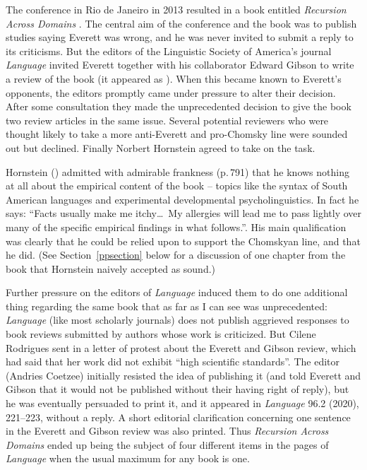 \documentclass[output=paper,colorlinks,citecolor=brown
]{langscibook}
\begin{document}
The conference in Rio de Janeiro in 2013 resulted in a book entitled
\textit{Recursion Across Domains} \citep{AmMaNeRo18}. The central aim
of the conference and the book was to publish studies saying Everett
was wrong, and he was never invited to submit a reply to its
criticisms. But the editors of the Linguistic Society of America's
journal \textit{Language} invited Everett together with his
collaborator Edward Gibson to write a review of the book (it appeared
as \citealt{EverGibs19}). When this became known to Everett's
opponents, the editors promptly came under pressure to alter their
decision. After some consultation they made the unprecedented decision
to give the book two review articles in the same issue. Several
potential reviewers who were thought likely to take a more anti-Everett
and pro-Chomsky line were sounded out but declined. Finally Norbert
Hornstein agreed to take on the task.

Hornstein (\citeyear{Hornstein19}) admitted with admirable frankness
(p.\,791) that he knows nothing at all about the empirical content
of the book -- topics like the syntax of South American languages
and experimental developmental psycholinguistics. In fact he says:
``Facts usually make me itchy\ldots\ My allergies will lead me to pass
lightly over many of the specific empirical findings in what follows.''.
His main qualification was clearly that he could be relied upon to
support the Chomskyan line, and that he did. (See Section~\ref{ppsection}
below for a discussion of one chapter from the book that Hornstein
naively accepted as sound.)

Further pressure on the editors of \textit{Language} induced them to do
one additional thing regarding the same book that as far as I can see was
unprecedented: \textit{Language} (like most scholarly journals) does not
publish aggrieved responses to book reviews submitted by authors whose
work is criticized.
But Cilene Rodrigues sent in a letter of protest about the Everett and
Gibson review, which had said that her work did not exhibit ``high
scientific standards''. The editor (Andries Coetzee) initially resisted
the idea of publishing it (and told Everett and Gibson that it would
not be published without their having right of reply), but he was eventually
persuaded to print it, and it appeared in \textit{Language} 96.2
(2020), 221--223, without a reply. A short editorial clarification
concerning one sentence in the Everett and Gibson review was also printed.
Thus \textit{Recursion Across Domains} ended up being the subject of
four different items in the pages of \textit{Language} when the usual
maximum for any book is one.
\end{document}
